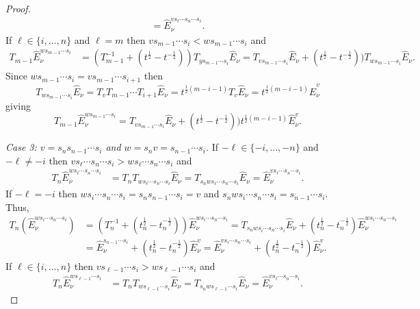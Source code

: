 \documentclass[11pt]{article}
\theoremstyle{plain}
\theoremstyle{definition}
\theoremstyle{remark}
\numberwithin{equation}{section}
\newcounter{r}
\newcounter{s}
\begin{document}
\begin{proof}
\begin{align*}
= \widehat{E}^{vs_\ell\cdots s_n \cdots s_i}_\nu.
\end{align*}
If $\ell\in \{i, \ldots, n\}$ and $\ell = m$ then $vs_{m-1}\cdots s_i < ws_{m-1}\cdots s_i$ and
\begin{align*}
T_{m-1}\widehat{E}^{ws_{m-1}\cdots s_i}_\nu
& = (T_{m-1}^{-1}+(t^{\frac12}-t^{-\frac12}))T_{ys_{m-1}\cdots s_i}\widehat{E}_\nu 
= T_{vs_{m-1}\cdots s_i}\widehat{E}_\nu  + (t^{\frac12}-t^{-\frac12}))T_{ws_{m-1}\cdots s_i}\widehat{E}_\nu.
\end{align*}
Since $ws_{m-1}\cdots s_i = vs_{m-1}\cdots s_{i+1}$ then
$$
T_{ws_{m-1}\cdots s_i}\widehat{E}_\nu 
= T_{v}T_{m-1}\cdots T_{i+1}\widehat{E}_\nu
= t^{\frac12(m-i-1)}T_{v}\widehat{E}_\nu
= t^{\frac12(m-i-1)}\widehat{E}^{v}_\nu
$$
giving
$$T_{m-1}\widehat{E}^{ws_{m-1}\cdots s_i}_\nu
= T_{vs_{m-1}\cdots s_i}\widehat{E}_\nu  + (t^{\frac12}-t^{-\frac12}))t^{\frac12(m-i-1)}\widehat{E}^{v}_\nu.
$$

\smallskip\noindent
\emph{Case 3: $v= s_ns_{n-1}\cdots s_i$ and $w=s_nv=s_{n-1}\cdots s_i$.}
\hfil\break
If $-\ell \in \{-i,\ldots, -n\}$ and $-\ell\ne -i$  then  $v s_\ell \cdots s_n \cdots s_i > w s_\ell\cdots s_n \cdots s_i$ and
\begin{align*}
T_{n} \widehat{E}^{ws_\ell \cdots s_n \cdots s_i}_\nu
&= T_{n}T_{ws_\ell \cdots s_n \cdots s_i}\widehat{E}_\nu
= T_{s_{n}ws_\ell\cdots s_n \cdots s_i}\widehat{E}_\nu
= \widehat{E}^{vs_\ell\cdots s_n \cdots s_i}_\nu.
\end{align*}
If $-\ell=-i$ then $ws_i\cdots s_n\cdots s_i = s_n s_{n-1}\cdots s_i=v$ and $s_n ws_i\cdots s_n \cdots s_i = s_{n-1}\cdots s_i$. Thus, 
\begin{align*}
T_n(\widehat{E}_\nu^{ws_i\cdots s_n \cdots s_i}) 
&= (T_n^{-1} + (t_n^{\frac12}-t_n^{-\frac12})) \widehat{E}_\nu^{ws_i\cdots s_n \cdots s_i} 
= T_{s_nws_i\cdots s_n \cdots s_i}\widehat{E}_\nu + (t_n^{\frac12}-t_n^{-\frac12})\widehat{E}_\nu^{ws_i\cdots s_n \cdots s_i} \\
&= \widehat{E}_\nu^{s_{n-1} \cdots s_i} + (t_n^{\frac12}-t_n^{-\frac12})\widehat{E}_\nu^{v} 
= \widehat{E}_\nu^{vs_i \cdots s_n \cdots s_i} + (t_n^{\frac12}-t_n^{-\frac12})\widehat{E}_\nu^{v}.
\end{align*}
If $\ell \in \{i, \ldots, n\}$ then $v s_{\ell-1} \cdots s_i > ws_{\ell-1} \cdots s_i$ and
\begin{align*}
T_n \widehat{E}^{ws_{\ell-1} \cdots  s_i}_\nu
&
= T_nT_{ws_{\ell-1} \cdots s_i}\widehat{E}_\nu
= T_{s_n ws_{\ell-1} \cdots s_i}\widehat{E}_\nu
= \widehat{E}^{vs_\ell\cdots s_n \cdots s_i}_\nu.
\end{align*}



\end{proof}
\end{document}
